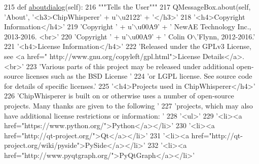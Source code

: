 \begin{DoxyCode}
215     \textcolor{keyword}{def }\hyperlink{classsoftware_1_1chipwhisperer_1_1common_1_1ui_1_1CWMainGUI_1_1CWMainGUI_affe17cecfd8de6d72f39cd85194ff67e}{aboutdialog}(self):
216         \textcolor{stringliteral}{"""Tells the User"""}
217         QMessageBox.about(self, \textcolor{stringliteral}{'About'}, \textcolor{stringliteral}{'<h3>ChipWhisperer'} + \textcolor{stringliteral}{u'\(\backslash\)u2122'} + \textcolor{stringliteral}{'</h3>'}
218                                          \textcolor{stringliteral}{'<h4>Copyright Information</h4>'}
219                                          \textcolor{stringliteral}{'Copyright '} + \textcolor{stringliteral}{u'\(\backslash\)u00A9'} + \textcolor{stringliteral}{' NewAE Technology Inc., 2013-2016.
       <br>'}
220                                          \textcolor{stringliteral}{'Copyright '} + \textcolor{stringliteral}{u'\(\backslash\)u00A9'} + \textcolor{stringliteral}{' Colin O\(\backslash\)'Flynn, 2012-2016.'}
221                                          \textcolor{stringliteral}{'<h4>License Information</h4>'}
222                                          \textcolor{stringliteral}{'Released under the GPLv3 License, see <a href="
      http://www.gnu.org/copyleft/gpl.html">License Details</a>.<br>'}
223                                          \textcolor{stringliteral}{'Various parts of this project may be released under additional
       open-source licenses such as the BSD License '}
224                                          \textcolor{stringliteral}{'or LGPL license. See source code for details of specific
       licenses.'}
225                                          \textcolor{stringliteral}{'<h4>Projects used in ChipWhisperer</h4>'}
226                                          \textcolor{stringliteral}{'ChipWhisperer is built on or otherwise uses a number of
       open-source projects. Many thanks are given to the following '}
227                                          \textcolor{stringliteral}{'projects, which may also have additional license restrictions or
       information: '}
228                                          \textcolor{stringliteral}{'<ul>'}
229                                          \textcolor{stringliteral}{'<li><a href="https://www.python.org/">Python</a></li>'}
230                                          \textcolor{stringliteral}{'<li><a href="http://qt-project.org/">Qt</a></li>'}
231                                          \textcolor{stringliteral}{'<li><a href="http://qt-project.org/wiki/pyside">PySide</a></li>'}
232                                          \textcolor{stringliteral}{'<li><a href="http://www.pyqtgraph.org/">PyQtGraph</a></li>'}

\end{DoxyCode}
